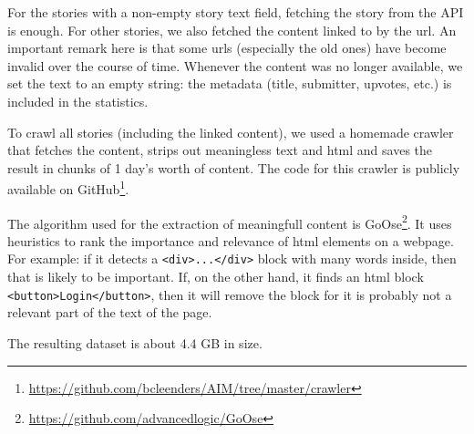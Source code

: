 For the stories with a non-empty story text field, fetching the story from the API is enough. For other stories, we also fetched the content linked to by the url. An important remark here is that some urls (especially the old ones) have become invalid over the course of time. Whenever the content was no longer available, we set the text to an empty string: the metadata (title, submitter, upvotes, etc.) is included in the statistics.

To crawl all stories (including the linked content), we used a homemade crawler that fetches the content, strips out meaningless text and html and saves the result in chunks of 1 day's worth of content. The code for this crawler is publicly available on GitHub\footnote{\url{https://github.com/bcleenders/AIM/tree/master/crawler}}.

The algorithm used for the extraction of meaningfull content is GoOse\footnote{\url{https://github.com/advancedlogic/GoOse}}. It uses heuristics to rank the importance and relevance of html elements on a webpage. For example: if it detects a \texttt{<div>...</div>} block with many words inside, then that is likely to be important. If, on the other hand, it finds an html block \texttt{<button>Login</button>}, then it will remove the block for it is probably not a relevant part of the text of the page.

The resulting dataset is about 4.4 GB in size.
